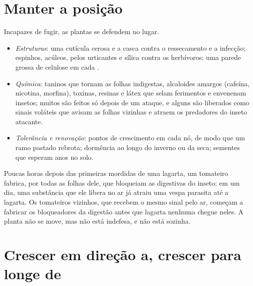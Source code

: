 \section{Manter a posição}

\begin{proposition}\label{prop:g12:plant-rooted-life:defences}
Incapazes de fugir, as plantas se defendem no lugar.
\begin{itemize}
  \item \emph{Estruturas}: uma cutícula cerosa e a casca contra o
        ressecamento e a infecção; espinhos, acúleos, pelos urticantes
        e sílica contra os herbívoros; uma parede grossa de celulose em
        cada .
  \item \emph{Química}: taninos que tornam as folhas indigestas,
        alcaloides amargos (cafeína, nicotina, morfina), toxinas,
        resinas e látex que selam ferimentos e envenenam insetos;
        muitos são feitos só depois de um ataque, e alguns são
        liberados como sinais voláteis que avisam as folhas vizinhas e
        atraem os predadores do inseto atacante.
  \item \emph{Tolerância e renovação}: pontos de crescimento em cada
        nó, de modo que um ramo pastado rebrota; dormência ao longo do
        inverno ou da seca; sementes que esperam anos no solo.
\end{itemize}
\end{proposition}
\admitted

\begin{example}\label{ex:g12:plant-rooted-life:caterpillar}
Poucas horas depois das primeiras mordidas de uma lagarta, um tomateiro
fabrica, por todas as folhas dele,  que bloqueiam as 
digestivas do inseto; em um dia, uma substância que ele libera no ar já
atraiu uma vespa parasita até a lagarta. Os tomateiros vizinhos, que
recebem o mesmo sinal pelo ar, começam a fabricar os bloqueadores da
digestão antes que lagarta nenhuma chegue neles. A planta não se move,
mas não está indefesa, e não está sozinha.
\end{example}

\section{Crescer em direção a, crescer para longe de}

